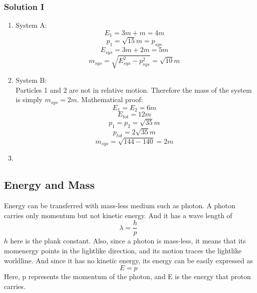 \documentclass[12pt]{book}
\begin{document}
\subsubsection{Solution I}
\begin{enumerate}
    \item System A:
    \[
    E_1 = 3m + m = 4m\]
    \[
    p_1 = \sqrt{15}m = p_{sys}
    \]
    \[
    E_{sys} = 3m + 2m = 5m
    \]
    \[
    m_{sys} = \sqrt{E_{sys}^2-p_{sys}^2}=\sqrt{10}m
    \]
    \item System B:\\
    Particles 1 and 2 are not in relative motion. Therefore the mass of the system is simply $m_{sys} = 2m$. Mathematical proof:
    \[
    E_1 = E_2 = 6m
    \]
    \[
    E_{tot}=12m
    \]
    \[
    p_1 = p_2 = \sqrt{35}m
    \]
    \[
    p_{tot}=2\sqrt{35}m
    \]
    \[
    m_{sys} = \sqrt{144 - 140} = 2m
    \]
    \item 
\end{enumerate}

\subsection{Energy and Mass}
Energy can be transferred with mass-less medium such as photon. A photon carries only momentum but not kinetic energy. And it has a wave length of 
\[
\lambda = \frac{h}{p}
\]
$h$ here is the plank constant. Also, since a photon is mass-less, it means that its momenergy points in the lightlike direction, and its motion traces the lightlike worldline. And since it has no kinetic energy, its energy can be easily expressed as 
\[
E = p 
\]
Here, p represents the momentum of the photon, and E is the energy that proton carries. \\
\newline
\end{document}
